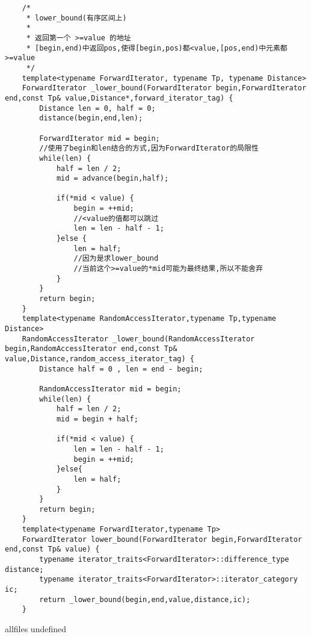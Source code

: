 \documentclass[a4paper,10pt]{article}
\begin{document}
\begin{CJK}{UTF8}{gbsn}     %

\else



\begin{lstlisting}
	/*
	 * lower_bound(有序区间上)
	 *
	 * 返回第一个 >=value 的地址
	 * [begin,end)中返回pos,使得[begin,pos)都<value,[pos,end)中元素都>=value
	 */
	template<typename ForwardIterator, typename Tp, typename Distance>
	ForwardIterator _lower_bound(ForwardIterator begin,ForwardIterator end,const Tp& value,Distance*,forward_iterator_tag) {
		Distance len = 0, half = 0;
		distance(begin,end,len);

		ForwardIterator mid = begin;
		//使用了begin和len结合的方式,因为ForwardIterator的局限性
		while(len) {
			half = len / 2;
			mid = advance(begin,half);

			if(*mid < value) {
				begin = ++mid;
				//<value的值都可以跳过
				len = len - half - 1;
			}else {
				len = half;
				//因为是求lower_bound
				//当前这个>=value的*mid可能为最终结果,所以不能舍弃
			}
		}
		return begin;
	}
	template<typename RandomAccessIterator,typename Tp,typename Distance>
	RandomAccessIterator _lower_bound(RandomAccessIterator begin,RandomAccessIterator end,const Tp& value,Distance,random_access_iterator_tag) {
		Distance half = 0 , len = end - begin;

		RandomAccessIterator mid = begin;
		while(len) {
			half = len / 2;
			mid = begin + half;

			if(*mid < value) {
				len = len - half - 1;
				begin = ++mid;
			}else{
				len = half;
			}
		}
		return begin;
	}
	template<typename ForwardIterator,typename Tp>
	ForwardIterator lower_bound(ForwardIterator begin,ForwardIterator end,const Tp& value) {
		typename iterator_traits<ForwardIterator>::difference_type distance;
		typename iterator_traits<ForwardIterator>::iterator_category ic;
		return _lower_bound(begin,end,value,distance,ic);
	}
\end{lstlisting}
\fi
\ifx allfiles undefined
\end{CJK}
\end{document}
